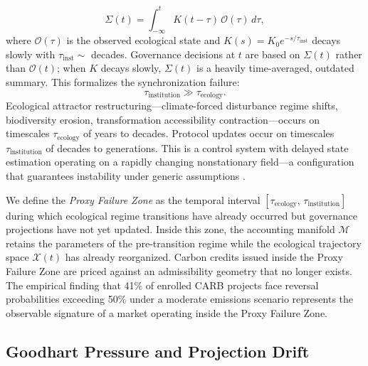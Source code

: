 \documentclass[12pt]{article}
\newcommand{\Xcal}{\mathcal{X}}
\newcommand{\Mcal}{\mathcal{M}}
\begin{document}
\begin{equation}
\label{eq:memory-kernel}
\Sigma(t) = \int_{-\infty}^t K(t-\tau)\,\mathcal{O}(\tau)\,d\tau,
\end{equation}
where $\mathcal{O}(\tau)$ is the observed ecological state and $K(s)=K_0 e^{-s/\tau_\text{inst}}$
decays slowly with $\tau_\text{inst}\sim$ decades. Governance decisions at $t$ are based
on $\Sigma(t)$ rather than $\mathcal{O}(t)$; when $K$ decays slowly, $\Sigma(t)$ is a
heavily time-averaged, outdated summary. This formalizes the synchronization failure:
\begin{equation}
\label{eq:sync-failure}
\tau_\text{institution} \gg \tau_\text{ecology}.
\end{equation}
Ecological attractor restructuring---climate-forced disturbance regime shifts, biodiversity
erosion, transformation accessibility contraction---occurs on timescales $\tau_\text{ecology}$
of years to decades. Protocol updates occur on timescales $\tau_\text{institution}$ of
decades to generations. This is a control system with delayed state estimation operating
on a rapidly changing nonstationary field---a configuration that guarantees instability
under generic assumptions \citep{Simon1962}.

We define the \emph{Proxy Failure Zone} as the temporal interval
$[\tau_\text{ecology},\,\tau_\text{institution}]$ during which ecological regime transitions
have already occurred but governance projections have not yet updated. Inside this zone,
the accounting manifold $\Mcal$ retains the parameters of the pre-transition regime while
the ecological trajectory space $\Xcal(t)$ has already reorganized. Carbon credits issued
inside the Proxy Failure Zone are priced against an admissibility geometry that no longer
exists. The empirical finding that 41\% of enrolled CARB projects face reversal
probabilities exceeding 50\% under a moderate emissions scenario represents the
observable signature of a market operating inside the Proxy Failure Zone.

\subsection{Goodhart Pressure and Projection Drift}
\end{document}
